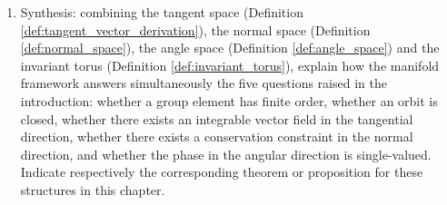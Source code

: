 \begin{enumerate}[leftmargin=3em, label=\textbf{Exercise \arabic*}]
    \item Synthesis: combining the tangent space (Definition \ref{def:tangent_vector_derivation}),
    the normal space (Definition \ref{def:normal_space}), the angle space (Definition \ref{def:angle_space})
    and the invariant torus (Definition \ref{def:invariant_torus}),
    explain how the manifold framework answers simultaneously the five questions raised in the introduction:
    whether a group element has finite order, whether an orbit is closed, whether there exists an integrable vector field in the tangential direction,
    whether there exists a conservation constraint in the normal direction, and whether the phase in the angular direction is single-valued.
    Indicate respectively the corresponding theorem or proposition for these structures in this chapter.
\end{enumerate}


